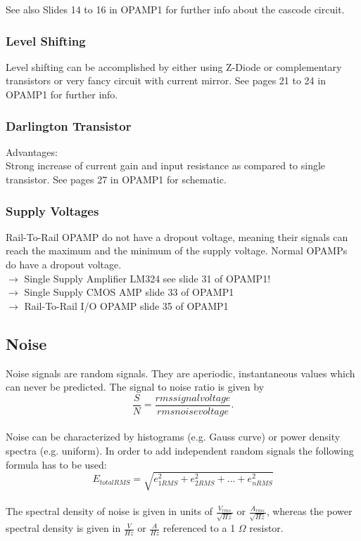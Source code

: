 			See also Slides 14 to 16 in OPAMP1 for further info about the cascode circuit. 

		\subsubsection{Level Shifting}
			Level shifting can be accomplished by either using Z-Diode or complementary transistors or very fancy circuit with current mirror. 
			See pages 21 to 24 in OPAMP1 for further info. 
			
		\subsubsection{Darlington Transistor}
			Advantages: \\
			Strong increase of current gain and input resistance as compared to single transistor. 
			See pages 27 in OPAMP1 for schematic. 
			
		\subsubsection{Supply Voltages}
			Rail-To-Rail OPAMP do not have a dropout voltage, meaning their signals can reach the maximum and the minimum of the supply voltage. Normal OPAMPs do have a dropout voltage. \\
			$\rightarrow$ Single Supply Amplifier LM324 see slide 31 of OPAMP1! \\
			$\rightarrow$ Single Supply CMOS AMP slide 33 of OPAMP1\\
			$\rightarrow$ Rail-To-Rail I/O OPAMP slide 35 of OPAMP1
	
	\subsection{Noise}
		Noise signals are random signals. They are aperiodic, instantaneous values which can never be predicted. The signal to noise ratio is given by
		\begin{equation}
			\frac{S}{N} = \frac{rms signal voltage}{rms noise voltage}.
		\end{equation}
		\\
		Noise can be characterized by histograms (e.g. Gauss curve) or power density spectra (e.g. uniform). In order to add independent random signals the following formula has to be used: 
		\begin{equation}
			E_{totalRMS} = \sqrt{e_{1RMS}^2 + e_{2RMS}^2 + ... + e_{nRMS}^2}
		\end{equation}
		\\
		The spectral density of noise is given in units of $\frac{V_{rms}}{\sqrt{Hz}}$ or $\frac{A_{rms}}{\sqrt{Hz}}$, whereas the power spectral density is given in $\frac{V}{Hz}$ or $\frac{A}{Hz}$ referenced to a 1 $\Omega$ resistor. \\
